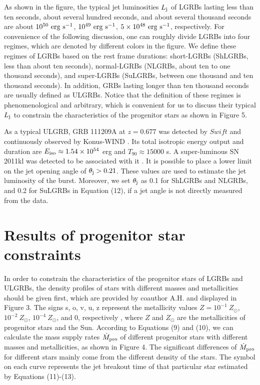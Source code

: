 \documentclass[twocolumn]{aastex6}
\begin{document}
As shown in the figure, the typical jet luminosities $L_{\rm j}$ of LGRBs lasting less than ten seconds, about several hundred seconds, and about several thousand seconds are about $10^{50}~\rm erg~s^{-1}$, $10^{49}~\rm erg~s^{-1}$, $5 \times 10^{48}~\rm erg~s^{-1}$, respectively. For convenience of the following discussion, one can roughly divide LGRBs into four regimes, which are denoted by different colors in the figure. We define these regimes of LGRBs based on the rest frame durations: short-LGRBs (ShLGRBs, less than about ten seconds), normal-LGRBs (NLGRBs, about ten to one thousand seconds), and super-LGRBs (SuLGRBs, between one thousand and ten thousand seconds). In addition, GRBs lasting longer than ten thousand seconds are usually defined as ULGRBs. Notice that the definition of these regimes is phenomenological and arbitrary, which is convenient for us to discuss their typical $L_{\rm j}$ to constrain the characteristics of the progenitor stars as shown in Figure 5.

As a typical ULGRB, GRB 111209A at $z=0.677$ was detected by $Swift$ \citep{Hoversten2011} and continuously observed by Konus-WIND \citep{Golenetskii2011}. Its total isotropic energy output \citep{Nakauchi2013} and duration are $E_{\rm iso} \approx 1.54 \times 10^{54}$ erg and $T_{90} \approx 15000$ s. A super-luminous SN 2011kl was detected to be associated with it \citep{Greiner2015}. It is possible to place a lower limit on the jet opening angle \citep{Levan2014} of $\theta_{\rm j}> 0.21$. These values are used to estimate the jet luminosity of the burst. Moreover, we set $\theta_{\rm j}$ as 0.1 for ShLGRBs and NLGRBs, and 0.2 for SuLGRBs in Equation (12), if a jet angle is not directly measured from the data.

\section{Results of progenitor star constraints}

In order to constrain the characteristics of the progenitor stars of LGRBs and ULGRBs, the density profiles of stars with different masses and metallicities should be given first, which are provided by coauthor A.H. and displayed in Figure 3. The signs s, o, v, u, z represent the metallicity values $Z =10^{-1}~Z_\odot$, $10^{-2}~Z_\odot$, $10^{-4}~Z_\odot$, and 0, respectively \citep{Woosley2002}, where $Z$ and $Z_\odot$ are the metallicities of progenitor stars and the Sun. According to Equations (9) and (10), we can calculate the mass supply rates $\dot{M}_{\rm pro}$ of different progenitor stars with different masses and metallicities, as shown in Figure 4. The significant differences of $\dot{M}_{\rm pro}$ for different stars mainly come from the different density of the stars. The symbol on each curve represents the jet breakout time of that particular star estimated by Equations (11)-(13).
\end{document}
